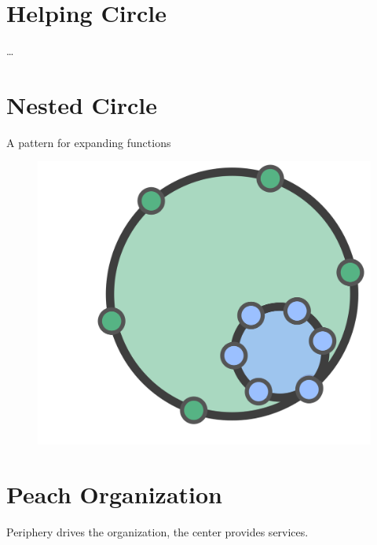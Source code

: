 \section{Helping Circle}
\label{helpingcircle}

{\ldots}

\section{Nested Circle}
\label{nestedcircle}

A pattern for expanding functions

\begin{figure}[htbp]
\centering
\includegraphics[keepaspectratio,width=\textwidth,height=0.75\textheight]{img/structural-patterns/nested-circle.png}
\end{figure}

\section{Peach Organization}
\label{peachorganization}

Periphery drives the organization, the center provides services.

